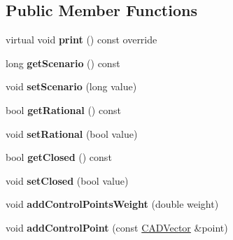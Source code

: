 \subsection*{Public Member Functions}
\begin{DoxyCompactItemize}
\item 
virtual void {\bfseries print} () const  override\hypertarget{class_c_a_d_spline_af55fc33b99264f27ba559fae0ca23079}{}\label{class_c_a_d_spline_af55fc33b99264f27ba559fae0ca23079}

\item 
long {\bfseries get\+Scenario} () const \hypertarget{class_c_a_d_spline_a0c07c11e312c020628a2d4cefda5df14}{}\label{class_c_a_d_spline_a0c07c11e312c020628a2d4cefda5df14}

\item 
void {\bfseries set\+Scenario} (long value)\hypertarget{class_c_a_d_spline_a86eb6f0dbd35068e87c16f45a9398a91}{}\label{class_c_a_d_spline_a86eb6f0dbd35068e87c16f45a9398a91}

\item 
bool {\bfseries get\+Rational} () const \hypertarget{class_c_a_d_spline_a021f37524ae01b13b9d938d08124f2f2}{}\label{class_c_a_d_spline_a021f37524ae01b13b9d938d08124f2f2}

\item 
void {\bfseries set\+Rational} (bool value)\hypertarget{class_c_a_d_spline_a39fbf9fd55607306d74e1b6df9532d0d}{}\label{class_c_a_d_spline_a39fbf9fd55607306d74e1b6df9532d0d}

\item 
bool {\bfseries get\+Closed} () const \hypertarget{class_c_a_d_spline_a362e3b03ce5b9a62bd8e0a7bb0c5d466}{}\label{class_c_a_d_spline_a362e3b03ce5b9a62bd8e0a7bb0c5d466}

\item 
void {\bfseries set\+Closed} (bool value)\hypertarget{class_c_a_d_spline_ab5bebcfe547c360f5eba02abff85a55e}{}\label{class_c_a_d_spline_ab5bebcfe547c360f5eba02abff85a55e}

\item 
void {\bfseries add\+Control\+Points\+Weight} (double weight)\hypertarget{class_c_a_d_spline_ae37d615fffef7a86c87faeffc1e864d6}{}\label{class_c_a_d_spline_ae37d615fffef7a86c87faeffc1e864d6}

\item 
void {\bfseries add\+Control\+Point} (const \hyperlink{class_c_a_d_vector}{C\+A\+D\+Vector} \&point)\hypertarget{class_c_a_d_spline_ab85788ce19c1526dd195fb24e12bd9a4}{}\label{class_c_a_d_spline_ab85788ce19c1526dd195fb24e12bd9a4}


\end{DoxyCompactItemize}
